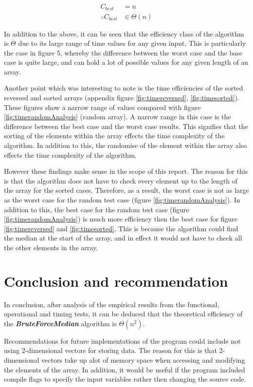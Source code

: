 \documentclass[12pt]{article}
\begin{document}
\begin{align*}
C_{best} &= n\\
\therefore C_{best} &\in \Theta(n)
\end{align*}

In addition to the above, it can be seen that the efficiency class of the algorithm is $\Theta$ due to its large range of time values for any given input. This is particularly the case in figure 5, whereby the difference between the worst case and the base case is quite large, and can hold a lot of possible values for any given length of an array.

Another point which was interesting to note is the time efficiencies of the sorted reversed and sorted arrays (appendix figure \ref{fig:timereversed}, \ref{fig:timesorted}). These figures show a narrow range of values compared with figure \ref{fig:timerandomAnalysis} (random array).  A narrow range in this case is the difference between the best case and the worst case results. This signifies that the sorting of the elements within the array effects the time complexity of the algorithm. In addition to this, the randomise of the element within the array also effects the time complexity of the algorithm.

However these findings make sense in the scope of this report. The reason for this is that the algorithm does not have to check every element up to the length of the array for the sorted cases. Therefore, as a result, the worst case is not as large as the worst case for the random test case (figure \ref{fig:timerandomAnalysis}). In addition to this, the best case for the random test case (figure  \ref{fig:timerandomAnalysis}) is much more efficiency then the best case for figure \ref{fig:timereversed} and \ref{fig:timesorted}. This is because the algorithm could find the median at the start of the array, and in effect it would not have to check all the other elements in the array. 


\section{Conclusion and recommendation}
In conclusion, after analysis of the empirical results from the functional, operational and timing tests, it can be deduced that the theoretical efficiency of the \textbf{\textit{BruteForceMedian}} algorithm is $\Theta (n^2)$.

Recommendations for future implementations of the program could include not using 2-dimensional vectors for storing data. The reason for this is that 2-dimensional vectors take up alot of memory space when accessing and modifying the elements of the array. In addition, it would be useful if the program included compile flags to specify the input variables rather then changing the source code.
\end{document}

